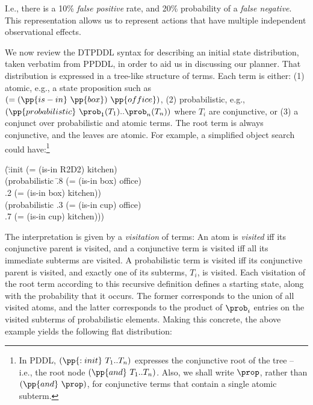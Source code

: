 \noindent I.e., there is a 10\% {\em false positive} rate, and 20\%
  probability of a {\em false negative}. This representation allows us to represent actions that have multiple independent observational effects.

We now review the DTPDDL syntax for describing an initial state
distribution, taken verbatim from PPDDL, in order to aid us in
discussing our planner. That distribution is expressed in a tree-like
structure of terms. Each term is either: (1) atomic, e.g., a state
proposition such as $(=(\pp{is-in}~\pp{box})~\pp{office})$, (2)
probabilistic, e.g., $(\pp{probabilistic}~\prob_1 (T_1) .. \prob_n
(T_n))$ where $T_i$ are conjunctive, or (3) a conjunct over
probabilistic and atomic terms. The root term is always conjunctive,
and the leaves are atomic. For example, a simplified object search
could have:\footnote{In PDDL, $(\pp{:init}~T_1..T_n)$ expresses the
conjunctive root of the tree -- i.e., the root node
$(\pp{and}~T_1..T_n)$. Also, we shall write $\prop$, rather than
$(\pp{and}~\prop)$, for conjunctive terms that contain a single atomic
subterm.}

\vspace{-1ex}
\small
\begin{tabtt}
(\=:init (= (is-in R2D2) kitchen) \+ \\
       (probabilistic \=.8 (= (is-in box) office)  \\
		      \>.2 (= (is-in box) kitchen)) \\
       (probabilistic .3 (= (is-in cup) office)  \\
		      \>.7 (= (is-in cup) kitchen))) \\
\end{tabtt}
\normalsize

\vspace{-3ex}

\noindent The interpretation is given
by a {\em visitation} of terms: An atom is {\em visited} iff
its conjunctive parent is visited, and a conjunctive term is visited
iff all its immediate subterms are visited. A probabilistic term is
visited iff its conjunctive parent is visited, and exactly one of its
subterms, $T_i$, is visited. Each visitation of the root term
according to this recursive definition defines a starting state,
along with the probability that it occurs. The former corresponds to the
union of all visited atoms, and the latter corresponds to the product
of $\prob_i$ entries on the visited subterms of probabilistic
elements. Making this concrete, the above example yields the
following flat distribution:


